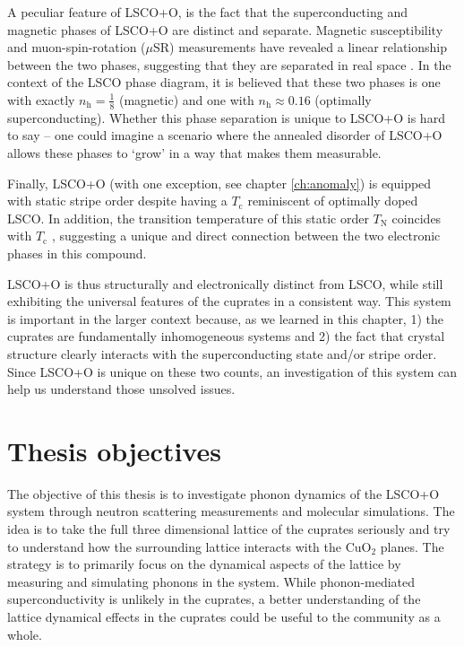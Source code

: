 A peculiar feature of LSCO+O, is the fact that the superconducting and magnetic phases of LSCO+O are distinct and separate. Magnetic susceptibility and muon-spin-rotation ($\mu$SR) measurements have revealed a linear relationship between the two phases, suggesting that they are separated in real space \cite{Mohottala2006,Udby2013}. In the context of the LSCO phase diagram, it is believed that these two phases is one with exactly $n_\text{h} = \frac{1}{8}$ (magnetic) and one with $n_\text{h} \approx 0.16$ (optimally superconducting). Whether this phase separation is unique to LSCO+O is hard to say -- one could imagine a scenario where the annealed disorder of LSCO+O allows these phases to `grow' in a way that makes them measurable.

Finally, LSCO+O (with one exception, see chapter \ref{ch:anomaly}) is equipped with static stripe order despite having a $T_\text{c}$ reminiscent of optimally doped LSCO. In addition, the transition temperature of this static order $T_\text{N}$ coincides with $T_\text{c}$ \cite{Udby2013}, suggesting a unique and direct connection between the two electronic phases in this compound.

LSCO+O is thus structurally and electronically distinct from LSCO, while still exhibiting the universal features of the cuprates in a consistent way. This system is important in the larger context because, as we learned in this chapter, 1) the cuprates are fundamentally inhomogeneous systems and 2) the fact that crystal structure clearly interacts with the superconducting state and/or stripe order. Since LSCO+O is unique on these two counts, an investigation of this system can help us understand those unsolved issues.

\section{Thesis objectives}
The objective of this thesis is to investigate phonon dynamics of the LSCO+O system through neutron scattering measurements and molecular simulations. The idea is to take the full three dimensional lattice of the cuprates seriously and try to understand how the surrounding lattice interacts with the CuO$_2$ planes. The strategy is to primarily focus on the dynamical aspects of the lattice by measuring and simulating phonons in the system. While phonon-mediated superconductivity is unlikely in the cuprates, a better understanding of the lattice dynamical effects in the cuprates could be useful to the community as a whole.

